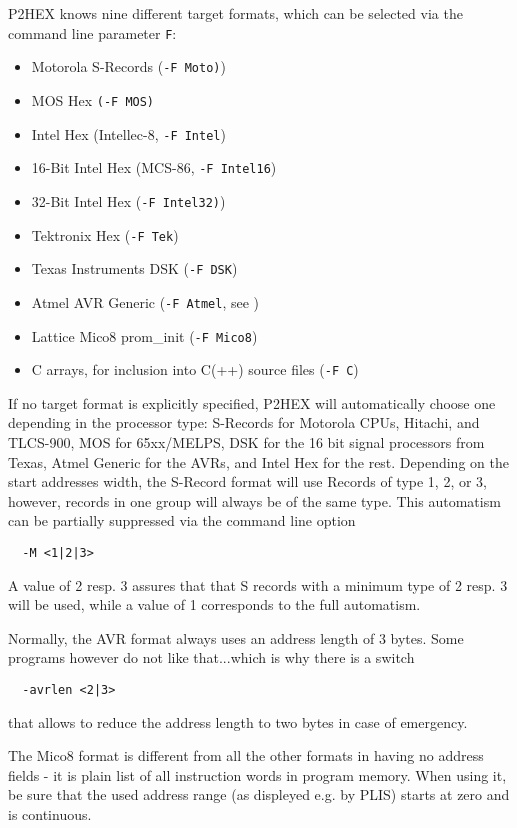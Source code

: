 \documentclass[12pt,twoside]{report}
\newcommand{\tty}[1]{{\tt #1}}
\begin{document}
P2HEX knows nine different target formats, which can be selected via the
command line parameter \tty{F}:
\begin{itemize}
\item{Motorola S-Records (\tty{-F Moto)})}
\item{MOS Hex \tty{(-F MOS)}}
\item{Intel Hex (Intellec-8, \tty{-F Intel})}
\item{16-Bit Intel Hex (MCS-86, \tty{-F Intel16})}
\item{32-Bit Intel Hex (\tty{-F Intel32)})}
\item{Tektronix Hex (\tty{-F Tek})}
\item{Texas Instruments DSK (\tty{-F DSK})}
\item{Atmel AVR Generic (\tty{-F Atmel}, see \cite{AVRObj})}
\item{Lattice Mico8 prom\_init (\tty{-F Mico8})}
\item{C arrays, for inclusion into C(++) source files (\tty{-F C})}
\end{itemize}
If no target format is explicitly specified, P2HEX will automatically
choose one depending in the processor type:  S-Records for Motorola
CPUs, Hitachi, and TLCS-900, MOS for 65xx/MELPS, DSK for the 16 bit
signal processors from Texas, Atmel Generic for the AVRs, and Intel Hex
for the rest.  Depending on the start addresses width, the S-Record
format will use Records of type 1, 2, or 3, however, records in one
group will always be of the same type.  This automatism can be partially
suppressed via the command line option
\begin{verbatim}
  -M <1|2|3>
\end{verbatim}
A value of 2 resp. 3 assures that that S records with a minimum type of 2
resp. 3 will be used, while a value of 1 corresponds to the full
automatism.

Normally, the AVR format always uses an address length of 3 bytes.  Some
programs however do not like that...which is why there is a switch
\begin{verbatim}
  -avrlen <2|3>
\end{verbatim}
that allows to reduce the address length to two bytes in case of
emergency.

The Mico8 format is different from all the other formats in
having no address fields - it is plain list of all instruction
words in program memory.  When using it, be sure that the used
address range (as displeyed e.g. by PLIS) starts at zero and is
continuous.
\end{document}
